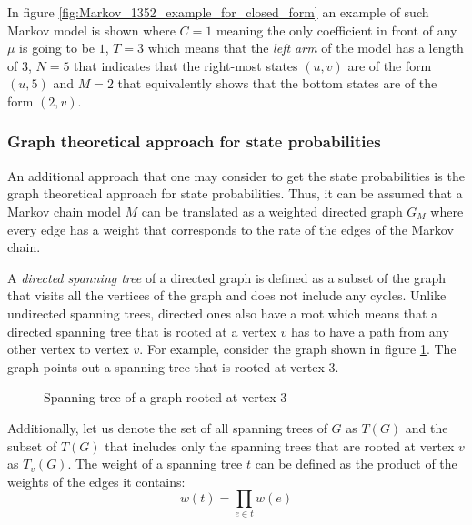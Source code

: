 In figure \ref{fig:Markov_1352_example_for_closed_form} an example of such Markov model is shown where \(C=1\) meaning the only coefficient in front of any \(\mu\) is going to be \(1\), \(T=3\) which means that the \textit{left arm} of the model has a length of \(3\), \(N=5\) that indicates that the right-most states \((u,v)\) are of the form \((u,5)\) and \(M=2\) that equivalently shows that the bottom states are of the form \((2,v)\).

\subsubsection{Graph theoretical approach for state probabilities}

An additional approach that one may consider to get the state probabilities is the graph theoretical approach for state probabilities. Thus, it can be assumed that a Markov chain model \(M\) can be translated as a weighted directed graph \(G_M\) where every edge has a weight that corresponds to the rate of the edges of the Markov chain. 

A \textit{directed spanning tree} of a directed graph is defined as a subset of the graph that visits all the vertices of the graph and does not include any cycles. Unlike undirected spanning trees, directed ones also have a root which means that a directed spanning tree that is rooted at a vertex \(v\) has to have a path from any other vertex to vertex \(v\). For example, consider the graph shown in figure \ref{fig:example_spanning_tree}. The graph points out a spanning tree that is rooted at vertex 3.


\begin{figure}[h]
    \centering
    \caption{Spanning tree of a graph rooted at vertex 3}
    \label{fig:example_spanning_tree}
\end{figure}

Additionally, let us denote the set of all spanning trees of \(G\) as \(T(G)\) and the subset of \(T(G)\) that includes only the spanning trees that are rooted at vertex \(v\) as \(T_v(G)\). The weight of a spanning tree \(t\) can be defined as the product of the weights of the edges it contains: 
\[w(t)=\prod_{e \in t} w(e)\]



